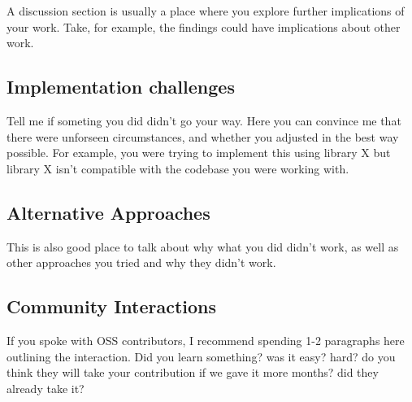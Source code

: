 A discussion section is usually a place where you explore further implications of your work.
Take, for example, the findings could have implications about other work.

\subsection{Implementation challenges}
Tell me if someting you did didn't go your way.
Here you can convince me that there were unforseen circumstances, and whether you adjusted in the best way possible.
For example, you were trying to implement this using library X but library X isn't compatible with the codebase you were working with.

\subsection{Alternative Approaches}
This is also good place to talk about why what you did didn't work, as well as other approaches you tried and why they didn't work.

\subsection{Community Interactions}
If you spoke with OSS contributors, I recommend spending 1-2 paragraphs here outlining the interaction. Did you learn something? was it easy? hard? do you think they will take your contribution if we gave it more months? did they already take it?

